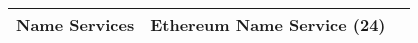 \begin{table}[t]
\begin{tabular}{|c|c|l|}
							
\multirow{1}{*}{Name Services}									& \textbf{Ethereum Name Service} (24)  \\  \hline	


\end{tabular}
\vspace{1em}
\end{table}

